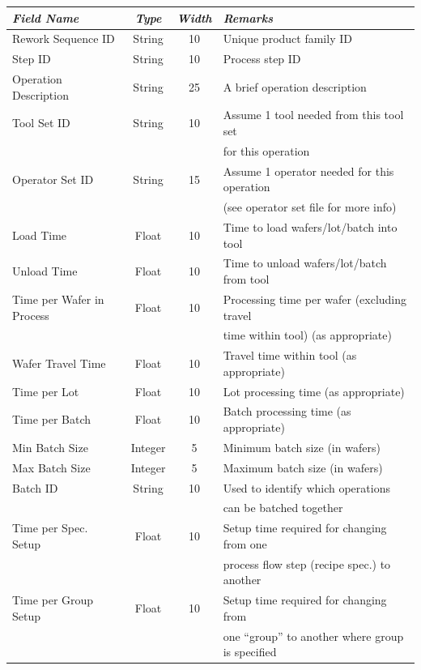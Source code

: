    \begin{center}
   \begin{tabular}{|l|c|c|l|}  \hline
   {\em Field Name} &  {\em Type} & {\em Width } & {\em Remarks} \\ \hline
   Rework Sequence ID  & String & 10 & Unique product family ID \\
   Step ID & String & 10 & Process step ID \\
   Operation Description  & String & 25 & A brief operation description \\
   Tool Set ID & String & 10 & Assume
   1 tool needed from this tool set \\
    & & & for this operation \\
   Operator Set ID & String & 15 &  Assume 1 operator needed for this
   operation \\
    & & & (see operator set file for more info) \\
   Load Time & Float & 10 & Time to load wafers/lot/batch into tool \\
   Unload Time & Float & 10 & Time to unload wafers/lot/batch from tool \\
   Time per Wafer in Process & Float & 10 & Processing time per wafer (excluding 
   travel \\
    & & & time within tool) (as appropriate) \\
   Wafer Travel Time & Float & 10 & Travel time within tool (as appropriate)\\
   Time per Lot & Float & 10 & Lot processing time (as appropriate) \\
   Time per Batch & Float & 10 & Batch processing time (as appropriate) \\
   Min Batch Size & Integer & 5 & Minimum batch size (in wafers) \\
   Max Batch Size & Integer & 5 & Maximum batch size (in wafers) \\
   Batch ID & String & 10 & Used to identify which operations \\
    & & & can be batched together \\
   Time per Spec. Setup & Float & 10 & Setup time required for changing from one 
   \\
    & & &  process flow step (recipe spec.) to another \\
   Time per Group Setup & Float & 10 & Setup time required for changing
   from \\
    & & & one ``group'' to another where group is specified \\

\end{tabular}
\end{center}
